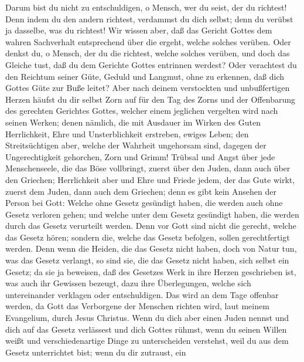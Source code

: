  Darum bist du nicht zu entschuldigen, o Mensch, wer du
seist, der du richtest! Denn indem du den andern richtest, verdammst du
dich selbst; denn du verübst ja dasselbe, was du richtest!
 Wir wissen aber, daß das Gericht Gottes dem wahren
Sachverhalt entsprechend über die ergeht, welche solches verüben.
 Oder denkst du, o Mensch, der du die richtest, welche
solches verüben, und doch das Gleiche tust, daß du dem Gerichte Gottes
entrinnen werdest?  Oder verachtest du den Reichtum seiner
Güte, Geduld und Langmut, ohne zu erkennen, daß dich Gottes Güte zur
Buße leitet?  Aber nach deinem verstockten und
unbußfertigen Herzen häufst du dir selbst Zorn auf für den Tag des Zorns
und der Offenbarung des gerechten Gerichtes Gottes, 
welcher einem jeglichen vergelten wird nach seinen Werken;
 denen nämlich, die mit Ausdauer im Wirken des Guten
Herrlichkeit, Ehre und Unsterblichkeit erstreben, ewiges Leben;
 den Streitsüchtigen aber, welche der Wahrheit ungehorsam
sind, dagegen der Ungerechtigkeit gehorchen, Zorn und Grimm!
 Trübsal und Angst über jede Menschenseele, die das Böse
vollbringt, zuerst über den Juden, dann auch über den Griechen;
 Herrlichkeit aber und Ehre und Friede jedem, der das
Gute wirkt, zuerst dem Juden, dann auch dem Griechen; 
denn es gibt kein Ansehen der Person bei Gott:  Welche
ohne Gesetz gesündigt haben, die werden auch ohne Gesetz verloren gehen;
und welche unter dem Gesetz gesündigt haben, die werden durch das Gesetz
verurteilt werden.  Denn vor Gott sind nicht die gerecht,
welche das Gesetz hören; sondern die, welche das Gesetz befolgen, sollen
gerechtfertigt werden.  Denn wenn die Heiden, die das
Gesetz nicht haben, doch von Natur tun, was das Gesetz verlangt, so sind
sie, die das Gesetz nicht haben, sich selbst ein Gesetz; 
da sie ja beweisen, daß des Gesetzes Werk in ihre Herzen geschrieben
ist, was auch ihr Gewissen bezeugt, dazu ihre Überlegungen, welche sich
untereinander verklagen oder entschuldigen.  Das wird an
dem Tage offenbar werden, da Gott das Verborgene der Menschen richten
wird, laut meinem Evangelium, durch Jesus Christus.  Wenn
du dich aber einen Juden nennst und dich auf das Gesetz verlässest und
dich Gottes rühmst,  wenn du seinen Willen weißt und
verschiedenartige Dinge zu unterscheiden verstehst, weil du aus dem
Gesetz unterrichtet bist;  wenn du dir zutraust, ein
